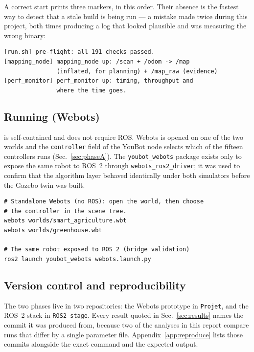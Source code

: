 A correct start prints three markers, in this order. Their absence is
the fastest way to detect that a stale build is being run --- a mistake
made twice during this project, both times producing a log that looked
plausible and was measuring the wrong binary:

\begin{lstlisting}[style=bash]
[run.sh] pre-flight: all 191 checks passed.
[mapping_node] mapping_node up: /scan + /odom -> /map
               (inflated, for planning) + /map_raw (evidence)
[perf_monitor] perf_monitor up: timing, throughput and
               where the time goes.
\end{lstlisting}

\subsection{Running \phaseA{} (Webots)}

\phaseA{} is self-contained and does not require ROS. Webots is opened
on one of the two worlds and the \texttt{controller} field of the YouBot
node selects which of the fifteen controllers runs
(Sec.~\ref{sec:phaseA}). The \texttt{youbot\_webots} package exists only
to expose the same robot to ROS~2 through
\texttt{webots\_ros2\_driver}; it was used to confirm that the algorithm
layer behaved identically under both simulators before the Gazebo twin
was built.

\begin{lstlisting}[style=bash,caption={Launching \phaseA{}.},
label={lst:webots}]
# Standalone Webots (no ROS): open the world, then choose
# the controller in the scene tree.
webots worlds/smart_agriculture.wbt
webots worlds/greenhouse.wbt

# The same robot exposed to ROS 2 (bridge validation)
ros2 launch youbot_webots webots.launch.py
\end{lstlisting}

\subsection{Version control and reproducibility}

The two phases live in two repositories: the Webots prototype in
\texttt{Projet}, and the ROS~2 stack in \texttt{ROS2\_stage}. Every
result quoted in Sec.~\ref{sec:results} names the commit it was produced
from, because two of the analyses in this report compare runs that
differ by a single parameter file. Appendix~\ref{app:reproduce} lists
those commits alongside the exact command and the expected output.
